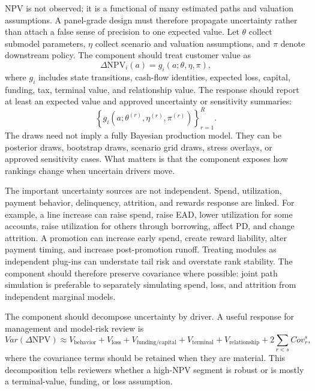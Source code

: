 \documentclass[11pt]{article}
\newcommand{\NPV}{\mathrm{NPV}}
\newcommand{\1}{\mathbf{1}}
\begin{document}
NPV is not observed; it is a functional of many estimated paths and valuation
assumptions. A panel-grade design must therefore propagate uncertainty rather
than attach a false sense of precision to one expected value. Let $\theta$
collect submodel parameters, $\eta$ collect scenario and valuation assumptions,
and $\pi$ denote downstream policy. The component should treat customer value
as
\begin{equation}
  \Delta \NPV_i(a)
  =
  g_i(a;\theta,\eta,\pi),
  \label{eq:npv-functional-uncertainty}
\end{equation}
where $g_i$ includes state transitions, cash-flow identities, expected loss,
capital, funding, tax, terminal value, and relationship value. The response
should report at least an expected value and approved uncertainty or
sensitivity summaries:
\begin{equation}
  \left\{
    g_i(a;\theta^{(r)},\eta^{(r)},\pi^{(r)})
  \right\}_{r=1}^{R}.
  \label{eq:npv-draws}
\end{equation}
The draws need not imply a fully Bayesian production model. They can be
posterior draws, bootstrap draws, scenario grid draws, stress overlays, or
approved sensitivity cases. What matters is that the component exposes how
rankings change when uncertain drivers move.

The important uncertainty sources are not independent. Spend, utilization,
payment behavior, delinquency, attrition, and rewards response are linked.
For example, a line increase can raise spend, raise EAD, lower utilization for
some accounts, raise utilization for others through borrowing, affect PD, and
change attrition. A promotion can increase early spend, create reward
liability, alter payment timing, and increase post-promotion runoff. Treating
modules as independent plug-ins can understate tail risk and overstate rank
stability. The component should therefore preserve covariance where possible:
joint path simulation is preferable to separately simulating spend, loss, and
attrition from independent marginal models.

The component should decompose uncertainty by driver. A useful response for
management and model-risk review is
\[
  Var(\Delta \NPV)
  \approx
  V_{\mathrm{behavior}}
  +V_{\mathrm{loss}}
  +V_{\mathrm{funding/capital}}
  +V_{\mathrm{terminal}}
  +V_{\mathrm{relationship}}
  +2\sum_{r<s}Cov_r^s,
\]
where the covariance terms should be retained when they are material. This
decomposition tells reviewers whether a high-NPV segment is robust or is
mostly a terminal-value, funding, or loss assumption.
\end{document}
